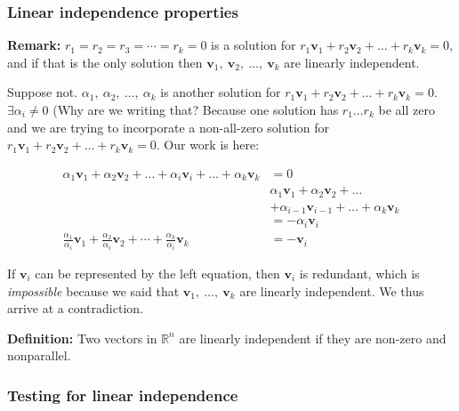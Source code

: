 \documentclass[12pt]{article}
\theoremstyle{plain}
\theoremstyle{remark}
\theoremstyle{definition}
\begin{document}
\subsubsection{Linear independence
properties}

\textbf{Remark:} \(r_{1} = r_{2} = r_{3} = \cdots = r_{k} = 0\) is a
solution for
\(r_{1}{\mathbf{v}}_{1} + r_{2}{\mathbf{v}}_{2} + \ldots + r_{k}{\mathbf{v}}_{k} = 0\),
and if that is the only solution then
\({\mathbf{v}}_{1},\ {\mathbf{v}}_{2},\ \ldots,\ {\mathbf{v}}_{k}\)
are linearly independent.

Suppose not. \(\alpha_{1},\ \alpha_{2},\ \ldots,\ \alpha_{k}\) is
another solution for
\(r_{1}{\mathbf{v}}_{1} + r_{2}{\mathbf{v}}_{2} + \ldots + r_{k}{\mathbf{v}}_{k} = 0\).
\(\exists\alpha_{i} \neq 0\) (Why are we writing that? Because one
solution has \(r_{1}\ldots r_{k}\) be all zero and we are trying to
incorporate a non-all-zero solution for
\(r_{1}{\mathbf{v}}_{1} + r_{2}{\mathbf{v}}_{2} + \ldots + r_{k}{\mathbf{v}}_{k} = 0\).
Our work is here:

\begin{align*}
\alpha_{1}{\mathbf{v}}_{1} + \alpha_{2}{\mathbf{v}}_{2} + \ldots + \alpha_{i}{\mathbf{v}}_{i} + \ldots + \alpha_{k}{\mathbf{v}}_{k} &= 0 \\
&\alpha_{1}{\mathbf{v}}_{1} + \alpha_{2}{\mathbf{v}}_{2} + \ldots  \\
&+ \alpha_{i - 1}{\mathbf{v}}_{i - 1} + \ldots + \alpha_{k}{\mathbf{v}}_{k}  \\
&= - \alpha_{i}{\mathbf{v}}_{i} \\
\frac{\alpha_{1}}{\alpha_{i}}{\mathbf{v}}_{1} + \frac{\alpha_{2}}{\alpha_{i}}{\mathbf{v}}_{2} + \cdots + \frac{\alpha_{k}}{\alpha_{i}}{\mathbf{v}}_{k} &= - {\mathbf{v}}_{i}
\end{align*}


If \({\mathbf{v}}_{i}\) can be represented by the left equation,
then \({\mathbf{v}}_{i}\) is redundant, which is \emph{impossible}
because we said that
\({\mathbf{v}}_{1},\ \ldots,\ {\mathbf{v}}_{k}\) are linearly
independent. We thus arrive at a contradiction.

\textbf{Definition:} Two vectors in \(\mathbb{R}^{n}\) are linearly
independent if they are non-zero and nonparallel.


\subsubsection{Testing for linear
independence}
\end{document}
